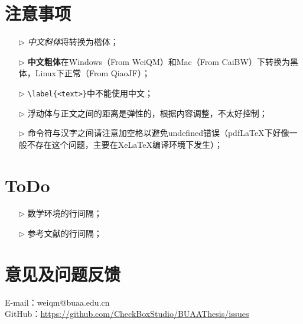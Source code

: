 \section{注意事项}
\begin{itemize}
  \item[$\triangleright$] \textit{中文斜体}将转换为楷体；
  \item[$\triangleright$] \textbf{中文粗体}在Windows（From WeiQM）和Mac（From CaiBW）下转换为黑体，Linux下正常（From QiaoJF）；
  \item[$\triangleright$] \verb|\label{<text>}|中不能使用中文；
  \item[$\triangleright$] 浮动体与正文之间的距离是弹性的，根据内容调整，不太好控制；
  \item[$\triangleright$] 命令符与汉字之间请注意加空格以避免undefined错误（pdfLaTeX下好像一般不存在这个问题，主要在XeLaTeX编译环境下发生）；
\end{itemize}

\section{ToDo}
\begin{itemize}
  \item[$\triangleright$] 数学环境的行间隔；
  \item[$\triangleright$] 参考文献的行间隔；
\end{itemize}

\section{意见及问题反馈}

\indent E-mail：weiqm@buaa.edu.cn \\
\indent GitHub：\href{https://github.com/CheckBoxStudio/BUAAThesis/issues}{https://github.com/CheckBoxStudio/BUAAThesis/issues}
